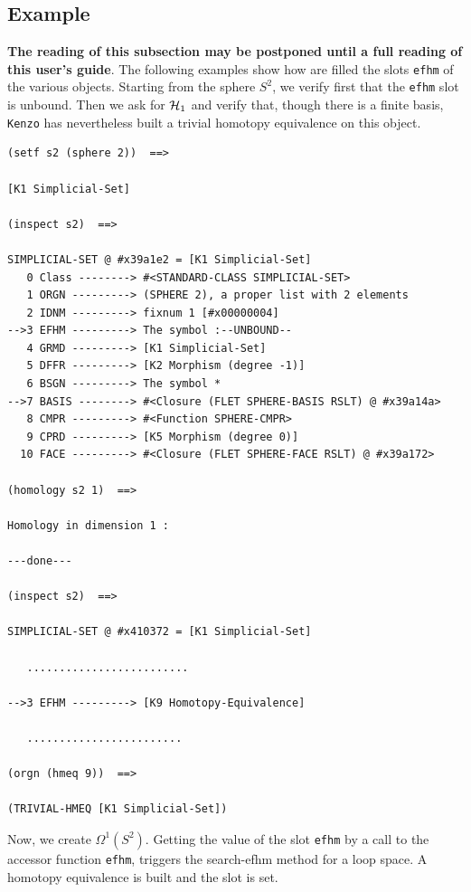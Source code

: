 \subsection*{Example}

{\bf The reading of this subsection may be postponed until a full reading of this user's guide}.
The following examples  show how are 
filled the slots {\tt efhm} of the various objects.
Starting from the sphere $S^2$, we  verify first that the {\tt efhm} slot is unbound.
Then we ask for ${\cal H}_1$ and verify that, though there is a finite basis,
{\tt Kenzo} has nevertheless built a trivial homotopy equivalence on this object. 
{\footnotesize\begin{verbatim}
(setf s2 (sphere 2))  ==>

[K1 Simplicial-Set]

(inspect s2)  ==>

SIMPLICIAL-SET @ #x39a1e2 = [K1 Simplicial-Set]
   0 Class --------> #<STANDARD-CLASS SIMPLICIAL-SET>
   1 ORGN ---------> (SPHERE 2), a proper list with 2 elements
   2 IDNM ---------> fixnum 1 [#x00000004]
-->3 EFHM ---------> The symbol :--UNBOUND--
   4 GRMD ---------> [K1 Simplicial-Set]
   5 DFFR ---------> [K2 Morphism (degree -1)]
   6 BSGN ---------> The symbol *
-->7 BASIS --------> #<Closure (FLET SPHERE-BASIS RSLT) @ #x39a14a>
   8 CMPR ---------> #<Function SPHERE-CMPR>
   9 CPRD ---------> [K5 Morphism (degree 0)]
  10 FACE ---------> #<Closure (FLET SPHERE-FACE RSLT) @ #x39a172>

(homology s2 1)  ==>

Homology in dimension 1 :

---done---

(inspect s2)  ==>

SIMPLICIAL-SET @ #x410372 = [K1 Simplicial-Set]

   .........................

-->3 EFHM ---------> [K9 Homotopy-Equivalence]

   ........................

(orgn (hmeq 9))  ==>

(TRIVIAL-HMEQ [K1 Simplicial-Set])
\end{verbatim}}
Now, we create $\Omega^1(S^2)$. Getting  the value of the slot {\tt efhm}
by a call to the accessor function {\tt efhm}, triggers the
search-efhm method for a loop space. A homotopy equivalence is built and
the slot is set.
